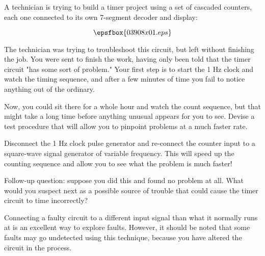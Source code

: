 

A technician is trying to build a timer project using a set of cascaded counters, each one connected to its own 7-segment decoder and display:

$$\epsfbox{03908x01.eps}$$

The technician was trying to troubleshoot this circuit, but left without finishing the job.  You were sent to finish the work, having only been told that the timer circuit "has some sort of problem."  Your first step is to start the 1 Hz clock and watch the timing sequence, and after a few minutes of time you fail to notice anything out of the ordinary.

Now, you could sit there for a whole hour and watch the count sequence, but that might take a long time before anything unusual appears for you to see.  Devise a test procedure that will allow you to pinpoint problems at a much faster rate.







Disconnect the 1 Hz clock pulse generator and re-connect the counter input to a square-wave signal generator of variable frequency.  This will speed up the counting sequence and allow you to see what the problem is much faster!

\vskip 10pt

Follow-up question: suppose you did this and found no problem at all.  What would you suspect next as a possible source of trouble that could cause the timer circuit to time incorrectly?







Connecting a faulty circuit to a different input signal than what it normally runs at is an excellent way to explore faults.  However, it should be noted that some faults may go undetected using this technique, because you have altered the circuit in the process.




